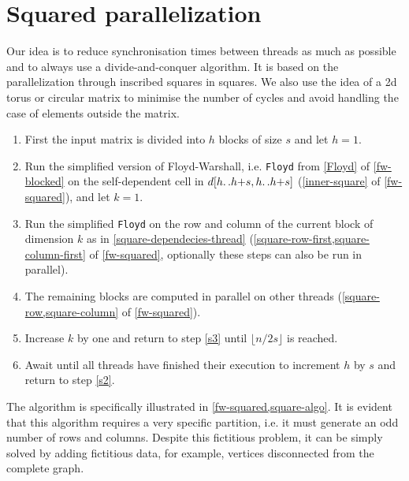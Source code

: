 \section{Squared parallelization}\label{squared-parallelization}

Our idea is to reduce synchronisation times between threads as much as possible and to always use a divide-and-conquer algorithm. 
It is based on the parallelization through inscribed squares in squares. We also use the idea of a 2d torus or circular matrix to minimise the number of cycles and avoid handling the case of elements outside the matrix.


\begin{enumerate}
    \item First the input matrix is divided into \(h\) blocks of size \(s\) and let \(h=1\).
    \item \label{s2} Run the simplified version of Floyd-Warshall, i.e. \texttt{Floyd} from \cref{Floyd} of \cref{fw-blocked} on the self-dependent cell in \(d[h{\mathinner {\ldotp \ldotp}}h{+}s,h{\mathinner {\ldotp \ldotp}}h{+}s]\) (\cref{inner-square} of \cref{fw-squared}), and let \(k=1\).
    \item \label{s3} Run the simplified \texttt{Floyd} on the row and column of the current block of dimension \(k\) as in \cref{square-dependecies-thread} (\cref{square-row-first,square-column-first} of \cref{fw-squared}, optionally these steps can also be run in parallel).
    \item The remaining blocks are computed in parallel on other threads (\cref{square-row,square-column} of \cref{fw-squared}).
    \item Increase \(k\) by one and return to step \ref{s3} until \(\lfloor n/2s \rfloor\) is reached.
    \item Await until all threads have finished their execution to increment \(h\) by \(s\) and return to step \ref{s2}.
\end{enumerate}
The algorithm is specifically illustrated in \cref{fw-squared,square-algo}.
It is evident that this algorithm requires a very specific partition, i.e. it must generate an odd number of rows and columns. 
Despite this fictitious problem, it can be simply solved by adding fictitious data, for example, vertices disconnected from the complete graph.
